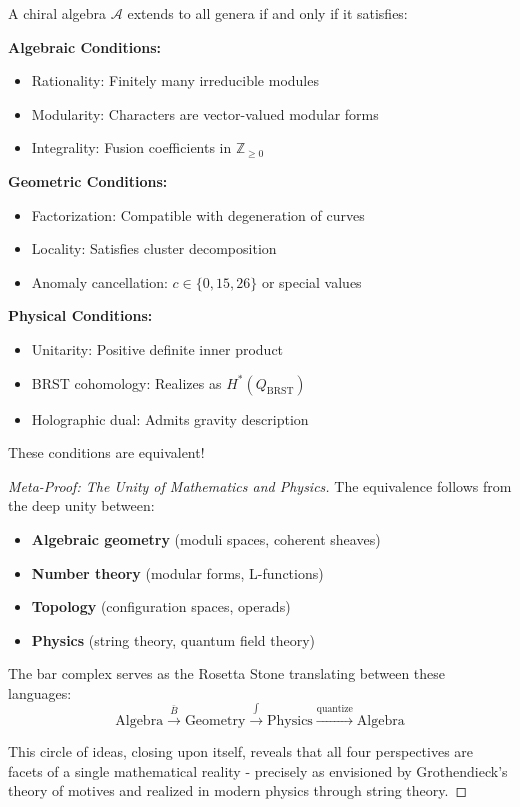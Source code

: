 \begin{theorem}\label{thm:universal-classification}
A chiral algebra $\mathcal{A}$ extends to all genera if and only if it satisfies:

\textbf{Algebraic Conditions:}
\begin{itemize}
\item Rationality: Finitely many irreducible modules
\item Modularity: Characters are vector-valued modular forms
\item Integrality: Fusion coefficients in $\mathbb{Z}_{\geq 0}$
\end{itemize}

\textbf{Geometric Conditions:}
\begin{itemize}
\item Factorization: Compatible with degeneration of curves
\item Locality: Satisfies cluster decomposition
\item Anomaly cancellation: $c \in \{0, 15, 26\}$ or special values
\end{itemize}

\textbf{Physical Conditions:}
\begin{itemize}
\item Unitarity: Positive definite inner product
\item BRST cohomology: Realizes as $H^*(Q_{\text{BRST}})$
\item Holographic dual: Admits gravity description
\end{itemize}

These conditions are equivalent!
\end{theorem}

\begin{proof}[Meta-Proof: The Unity of Mathematics and Physics]
The equivalence follows from the deep unity between:
\begin{itemize}
\item \textbf{Algebraic geometry} (moduli spaces, coherent sheaves)
\item \textbf{Number theory} (modular forms, L-functions)
\item \textbf{Topology} (configuration spaces, operads)
\item \textbf{Physics} (string theory, quantum field theory)
\end{itemize}

The bar complex serves as the Rosetta Stone translating between these languages:
$$\text{Algebra} \xrightarrow{\bar{B}} \text{Geometry} \xrightarrow{\int} \text{Physics} \xrightarrow{\text{quantize}} \text{Algebra}$$

This circle of ideas, closing upon itself, reveals that all four perspectives are facets of a single mathematical reality - precisely as envisioned by Grothendieck's theory of motives and realized in modern physics through string theory.
\end{proof}

